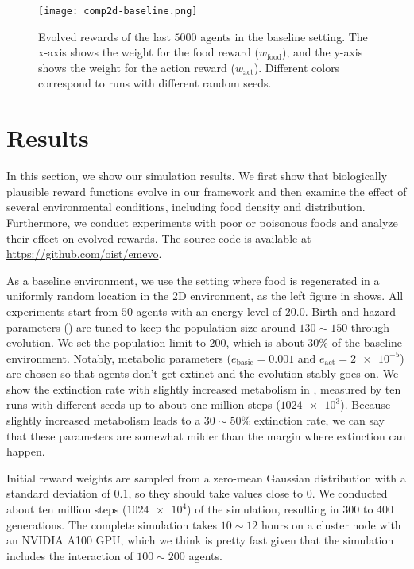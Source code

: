 \begin{figure}[t]
  \centering
  \texttt{[image: comp2d-baseline.png]}
  \caption{
    Evolved rewards of the last $5000$ agents in the baseline setting.
    The x-axis shows the weight for the food reward ($w_{\mathrm{food}}$), and the y-axis shows the weight for the action reward ($w_{\mathrm{act}}$).
    Different colors correspond to runs with different random seeds.
  }\label{figure:result-baseline}
\end{figure}

\section{Results}
In this section, we show our simulation results. We first show that biologically plausible reward functions evolve in our framework and then examine the effect of several environmental conditions, including food density and distribution. Furthermore, we conduct experiments with poor or poisonous foods and analyze their effect on evolved rewards. The source code is available at \url{https://github.com/oist/emevo}.

As a baseline environment, we use the setting where food is regenerated in a uniformly random location in the 2D environment, as the left figure in  shows. All experiments start from $50$ agents with an energy level of $20.0$. Birth and hazard parameters () are tuned to keep the population size around $130\sim 150$ through evolution. We set the population limit to $200$, which is about $30\%$ of the baseline environment.  Notably, metabolic parameters ($e_{\mathrm{basic}} = 0.001$ and $e_{\mathrm{act}} = \num{2e-5}$) are chosen so that agents don't get extinct and the evolution stably goes on. We show the extinction rate with slightly increased metabolism in , measured by ten runs with different seeds up to about one million steps ($\num{1024e3}$). Because slightly increased metabolism leads to a $30\sim50\%$ extinction rate, we can say that these parameters are somewhat milder than the margin where extinction can happen.

Initial reward weights are sampled from a zero-mean Gaussian distribution with a standard deviation of $0.1$, so they should take values close to $0$. We conducted about ten million steps ($\num{1024e4}$) of the simulation, resulting in $300$ to $400$ generations. The complete simulation takes $10\sim12$ hours on a cluster node with an NVIDIA A100 GPU, which we think is pretty fast given that the simulation includes the interaction of $100\sim200$ agents.

